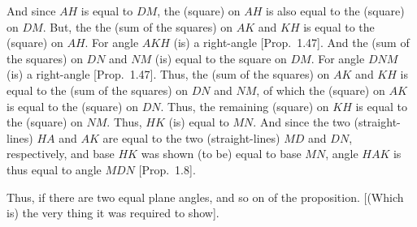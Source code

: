 \begin{Parallel}{}{}
{And since $AH$ is equal to $DM$, the (square) on $AH$ is also equal
to the (square) on $DM$. But, the the (sum of the squares) on $AK$ and $KH$ is equal to the (square) on $AH$. For angle $AKH$
(is) a right-angle [Prop.~1.47]. And the (sum of the 
squares) on $DN$ and
$NM$ (is) equal to the square
on $DM$. For angle $DNM$ (is) a right-angle [Prop.~1.47]. Thus, the (sum of the squares) on $AK$ and
$KH$ is equal to the (sum of the squares) on $DN$ and $NM$, of
which the (square) on $AK$ is equal to the (square) on $DN$. Thus, the
remaining (square) on $KH$ is equal to the (square) on $NM$. Thus,
$HK$ (is) equal to $MN$. And since the two (straight-lines) $HA$ and
$AK$ are equal to the two (straight-lines) $MD$ and $DN$, respectively,
and base $HK$ was shown (to be) equal to base $MN$,  angle
$HAK$ is thus equal to angle $MDN$ [Prop.~1.8].

Thus, if there are two equal plane angles, and so on of the proposition. [(Which is) the very thing it was required to show].}
\end{Parallel}

\begin{Parallel}{}{}

\end{Parallel}

